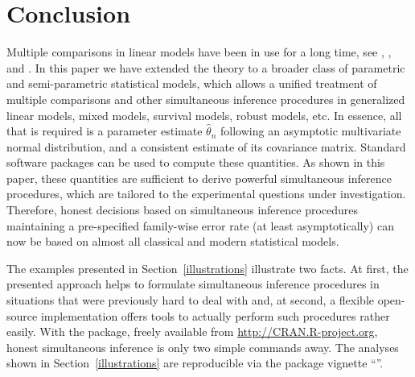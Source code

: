 \documentclass[12pt,a4paper]{article}
\begin{document}




\section{Conclusion}

Multiple comparisons in linear models have been in use for a long time, see 
\cite{HochbergTamhane1987}, \cite{Hsu1996}, and \cite{Bretzetal2008}. In
this paper we have extended the theory to a broader class of parametric and
semi-parametric statistical models, which allows a unified treatment of
multiple comparisons and other simultaneous inference procedures in
generalized linear models, mixed models, survival models, robust models, etc.
In essence, all that is required is a parameter estimate $\hat{\theta}_n$
following an asymptotic multivariate normal distribution, and a consistent
estimate of its covariance matrix. Standard software packages
can be used to compute these quantities. As shown in this paper, these
quantities are sufficient to derive powerful simultaneous inference
procedures, which are tailored to the experimental questions under
investigation. Therefore, honest decisions based on simultaneous inference
procedures maintaining a pre-specified family-wise error rate (at least
asymptotically) can now be
based on almost all classical and modern statistical models.

The examples presented in Section~\ref{illustrations} illustrate two facts.
At first, the presented approach helps to formulate simultaneous inference
procedures in situations that were previously hard to deal with and, at
second, a flexible open-source implementation offers tools to actually
perform such procedures rather easily. With the  package,
freely available from \url{http://CRAN.R-project.org}, honest simultaneous
inference is only two simple \RR{} commands away. The analyses shown
in Section~\ref{illustrations} are reproducible via the 
package vignette ``''.



\end{document}
